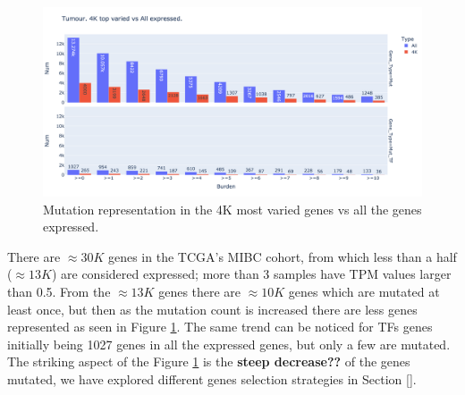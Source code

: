 \begin{figure}[!htb]    \centering\includegraphics[width=1.0\textwidth,height=0.6\textheight,keepaspectratio]{Sections/Network_I/Resources/Tum_network/MutTF_representation_4K-all.png}
    \caption{Mutation representation in the 4K most varied genes vs all the genes expressed.}
    \label{fig:N_I:mut_rep_tum}
\end{figure}


There are $\approx30K$ genes in the TCGA's MIBC cohort, from which less than a half ($\approx13K$) are considered expressed; more than 3 samples have TPM values larger than 0.5. From the $\approx13K$ genes there are $\approx10K$ genes which are mutated at least once, but then as the mutation count is increased there are less genes represented as seen in Figure \ref{fig:N_I:mut_rep_tum}. The same trend can be noticed for TFs genes initially being 1027 genes in all the expressed genes, but only a few are mutated. The striking aspect of the Figure \ref{fig:N_I:mut_rep_tum} is the \textbf{steep decrease??} of the genes mutated, we have explored different genes selection strategies in Section \ref{}.

